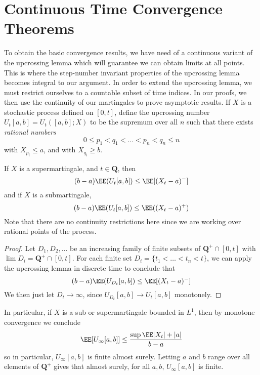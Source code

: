 \section{Continuous Time Convergence Theorems}

To obtain the basic convergence results, we have need of a continuous variant of the upcrossing lemma which will guarantee we can obtain limits at all points. This is where the step-number invariant properties of the upcrossing lemma becomes integral to our argument. In order to extend the upcrossing lemma, we must restrict ourselves to a countable subset of time indices. In our proofs, we then use the continuity of our martingales to prove asymptotic results. If $X$ is a stochastic process defined on $[0,t]$, define the upcrossing number $U_t[a,b] = U_t([a,b];X)$ to be the supremum over all $n$ such that there exists {\it rational numbers}
%
\[ 0 \leq p_1 < q_1 < \dots < p_n < q_n \leq n \]
%
with $X_{p_i} \leq a$, and with $X_{q_i} \geq b$.

\begin{lemma}
    If $X$ is a supermartingale, and $t \in \mathbf{Q}$, then
    \[ (b - a) \EE(U_t[a,b]) \leq \EE[(X_t - a)^-] \]
    and if $X$ is a submartingale,
    \[ (b - a) \EE(U_t[a,b]) \leq \EE((X_t - a)^+) \]
    Note that there are no continuity restrictions here since we are working over rational points of the process.
\end{lemma}
\begin{proof}
    Let $D_1, D_2, \dots$ be an increasing family of finite subsets of $\mathbf{Q}^+ \cap [0,t]$ with $\lim D_i = \mathbf{Q}^+ \cap [0,t]$. For each finite set $D_i = \{ t_1 < \dots < t_n < t \}$, we can apply the upcrossing lemma in discrete time to conclude that
    \[ (b-a) \EE(U_{D_t}[a,b]) \leq \EE[(X_t - a)^-] \]
    We then just let $D_t \to \infty$, since $U_{D_t}[a,b] \to U_t[a,b]$ monotonely.
\end{proof}

In particular, if $X$ is a sub or supermartingale bounded in $L^1$, then by monotone convergence we conclude
%
\[ \EE[U_\infty[a,b]] \leq \frac{\sup \EE|X_t| + |a|}{b - a} \]
%
so in particular, $U_\infty[a,b]$ is finite almost surely. Letting $a$ and $b$ range over all elements of $\mathbf{Q}^+$ gives that almost surely, for all $a,b$, $U_\infty[a,b]$ is finite.


